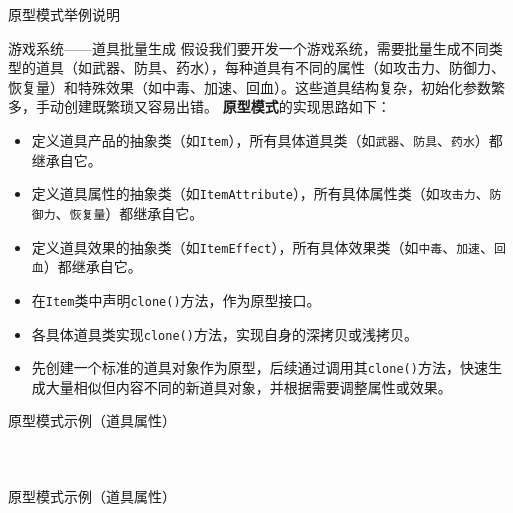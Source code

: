 \documentclass[UTF8,aspectratio=169]{beamer}
\begin{document}
\begin{frame}{原型模式举例说明}
    \begin{exampleytublock}{游戏系统——道具批量生成}
        假设我们要开发一个游戏系统，需要批量生成不同类型的道具（如武器、防具、药水），每种道具有不同的属性（如攻击力、防御力、恢复量）和特殊效果（如中毒、加速、回血）。这些道具结构复杂，初始化参数繁多，手动创建既繁琐又容易出错。
        \textbf{原型模式}的实现思路如下：
        \begin{itemize}
            \item 定义道具产品的抽象类（如\texttt{Item}），所有具体道具类（如\texttt{武器}、\texttt{防具}、\texttt{药水}）都继承自它。
            \item 定义道具属性的抽象类（如\texttt{ItemAttribute}），所有具体属性类（如\texttt{攻击力}、\texttt{防御力}、\texttt{恢复量}）都继承自它。
            \item 定义道具效果的抽象类（如\texttt{ItemEffect}），所有具体效果类（如\texttt{中毒}、\texttt{加速}、\texttt{回血}）都继承自它。
            \item 在\texttt{Item}类中声明\texttt{clone()}方法，作为原型接口。
            \item 各具体道具类实现\texttt{clone()}方法，实现自身的深拷贝或浅拷贝。
            \item 先创建一个标准的道具对象作为原型，后续通过调用其\texttt{clone()}方法，快速生成大量相似但内容不同的新道具对象，并根据需要调整属性或效果。
        \end{itemize}
    \end{exampleytublock}
\end{frame}

\begin{frame}{原型模式示例（道具属性）}
    \begin{columns}
        \begin{column}{0.48\textwidth}
            \inputminted[firstline=1, lastline=17]{cpp}{code/prototype_pattern.cpp}
        \end{column}
        \begin{column}{0.48\textwidth}
            \inputminted[firstline=19, lastline=30]{cpp}{code/prototype_pattern.cpp}
        \end{column}
    \end{columns}
\end{frame}

\begin{frame}{原型模式示例（道具属性）}
    \begin{columns}
        \begin{column}{0.48\textwidth}
            \inputminted[firstline=32, lastline=43]{cpp}{code/prototype_pattern.cpp}
        \end{column}
        \begin{column}{0.48\textwidth}
            \inputminted[firstline=45, lastline=56]{cpp}{code/prototype_pattern.cpp}
        \end{column}
    \end{columns}
\end{frame}
\end{document}
